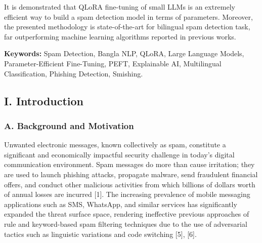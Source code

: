 It is demonstrated that QLoRA fine-tuning of small LLMs is an extremely
efficient way to build a spam detection model in terms of parameters.
Moreover, the presented methodology is state-of-the-art for bilingual
spam detection task, far outperforming machine learning algorithms
reported in previous works.

\textbf{Keywords:} Spam Detection, Bangla NLP, QLoRA, Large Language
Models, Parameter-Efficient Fine-Tuning, PEFT, Explainable AI,
Multilingual Classification, Phishing Detection, Smishing.

\subsection{I. Introduction}\label{i.-introduction}

\subsubsection{A. Background and
Motivation}\label{a.-background-and-motivation}

Unwanted electronic messages, known collectively as spam, constitute a
significant and economically impactful security challenge in today's
digital communication environment. Spam messages do more than cause
irritation; they are used to launch phishing attacks, propagate malware,
send fraudulent financial offers, and conduct other malicious activities
from which billions of dollars worth of annual losses are incurred
{[}1{]}. The increasing prevalence of mobile messaging applications such
as SMS, WhatsApp, and similar services has significantly expanded the
threat surface space, rendering ineffective previous approaches of rule
and keyword-based spam filtering techniques due to the use of
adversarial tactics such as linguistic variations and code switching
{[}5{]}, {[}6{]}.

